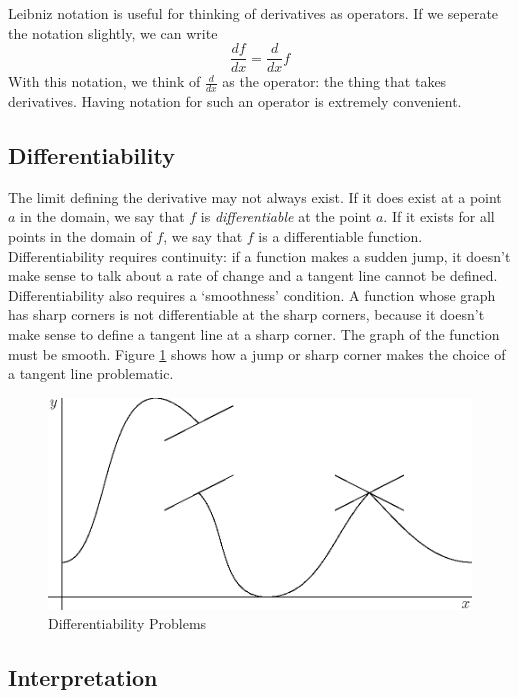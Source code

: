 \documentclass[fleqn]{report}
\begin{document}
Leibniz notation is useful for thinking of derivatives as
operators. If we seperate the notation slightly, we can write
\begin{equation*}
\frac{df}{dx} = \frac{d}{dx} f
\end{equation*}
With this notation, we think of $\frac{d}{dx}$ as the
operator: the thing that takes derivatives. Having notation
for such an operator is extremely convenient.

\subsection{Differentiability}
\label{differentiability}

The limit defining the derivative may not always exist. If it
does exist at a point $a$ in the domain, we say that $f$ is
\emph{differentiable} at the point $a$. If it exists for all points
in the domain of $f$, we say that $f$ is a differentiable
function. Differentiability requires continuity: if a
function makes a sudden jump, it doesn't make sense to talk
about a rate of change and a tangent line cannot be defined.
Differentiability also requires a `smoothness' condition. A
function whose graph has sharp corners is not differentiable
at the sharp corners, because it doesn't make sense to define
a tangent line at a sharp corner. The graph of the function
must be smooth. Figure \ref{figure-differentiability-problems} shows
how a jump or sharp corner makes the choice of a tangent line
problematic.

\begin{figure}[t]
\centering
\includegraphics[width=12cm]{figure48.eps}
\caption{Differentiability Problems}
\label{figure-differentiability-problems}
\end{figure}

\subsection{Interpretation}
\label{derivative-interpretation}
\end{document}

